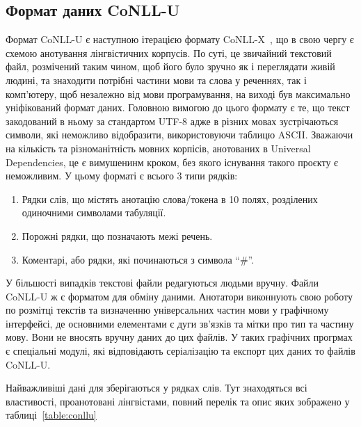 \subsection{Формат даних CoNLL-U}
Формат CoNLL-U є наступною ітерацією формату CoNLL-X~\cite{bib11},
що в свою чергу є схемою анотування лінгвістичних корпусів.
По суті, це звичайний текстовий файл, розмічений таким чином, щоб
його було зручно як і переглядати живій людині, та знаходити потрібні
частини мови та слова у реченнях, так і комп'ютеру, щоб незалежно
від мови програмування, на виході був максимально уніфікований формат даних.
Головною вимогою до цього формату є те, що текст закодований в ньому за
стандартом UTF-8 адже в різних мовах зустрічаються символи, які
неможливо відобразити, використовуючи таблицю ASCII. Зважаючи на
кількість та різноманітність мовних корпісів, анотованих в Universal Dependencies,
це є вимушенинм кроком, без якого існування такого проєкту є неможливим.
У цьому форматі є всього 3 типи рядків:

\begin{enumerate}
    \item Рядки слів, що містять анотацію слова/токена в 10 полях, розділених
    одиночними символами табуляції.
    \item Порожні рядки, що позначають межі речень.
    \item Коментарі, або рядки, які починаються з символа ``\#''.
\end{enumerate}

У більшості випадків текстові файли редагуються людьми вручну. Файли
CoNLL-U ж є форматом для обміну даними. Анотатори виконнують свою
роботу по розмітці текстів та визначенню універсальних частин мови
у графічному інтерфейсі, де основними елементами є дуги зв'язків
та мітки про тип та частину мову. Вони не вносять вручну даних до
цих файлів. У таких графічних прогрмах є спеціальні модулі,
які відповідають серіалізацію та експорт цих даних то файлів CoNLL-U.

Найважливіші дані для зберігаються у рядках слів. Тут знаходяться всі властивості,
проанотовані лінгвістами, повний перелік та опис яких зображено у
таблиці~\ref{table:conllu}

